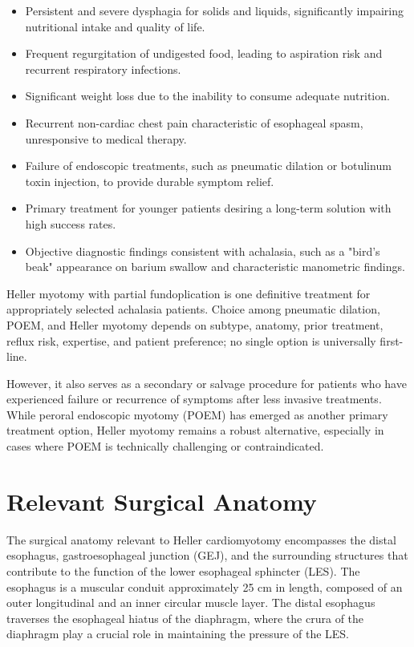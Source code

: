 \begin{itemize}
  \item Persistent and severe dysphagia for solids and liquids, significantly impairing nutritional intake and quality of life.
  \item Frequent regurgitation of undigested food, leading to aspiration risk and recurrent respiratory infections.
  \item Significant weight loss due to the inability to consume adequate nutrition.
  \item Recurrent non-cardiac chest pain characteristic of esophageal spasm, unresponsive to medical therapy.
  \item Failure of endoscopic treatments, such as pneumatic dilation or botulinum toxin injection, to provide durable symptom relief.
  \item Primary treatment for younger patients desiring a long-term solution with high success rates.
  \item Objective diagnostic findings consistent with achalasia, such as a "bird's beak" appearance on barium swallow and characteristic manometric findings.
\end{itemize}

Heller myotomy with partial fundoplication is one definitive treatment for appropriately selected achalasia patients. Choice among pneumatic dilation, POEM, and Heller myotomy depends on subtype, anatomy, prior treatment, reflux risk, expertise, and patient preference; no single option is universally first-line.

However, it also serves as a secondary or salvage procedure for patients who have experienced failure or recurrence of symptoms after less invasive treatments. While peroral endoscopic myotomy (POEM) has emerged as another primary treatment option, Heller myotomy remains a robust alternative, especially in cases where POEM is technically challenging or contraindicated.

\section*{Relevant Surgical Anatomy}
The surgical anatomy relevant to Heller cardiomyotomy encompasses the distal esophagus, gastroesophageal junction (GEJ), and the surrounding structures that contribute to the function of the lower esophageal sphincter (LES). The esophagus is a muscular conduit approximately 25 cm in length, composed of an outer longitudinal and an inner circular muscle layer. The distal esophagus traverses the esophageal hiatus of the diaphragm, where the crura of the diaphragm play a crucial role in maintaining the pressure of the LES.

